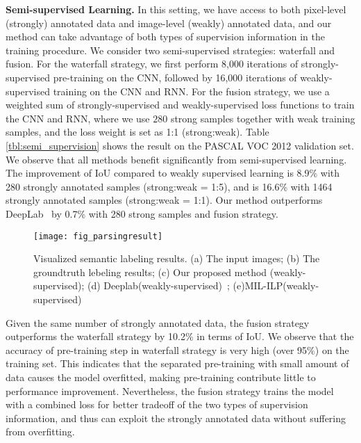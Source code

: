 \documentclass[10pt,twocolumn,letterpaper]{article}
\begin{document}
\textbf{Semi-supervised Learning.}
In this setting, we have access to both pixel-level (strongly) annotated data and image-level (weakly) annotated data, and our method can take advantage of both types of supervision information in the training procedure. We consider two semi-supervised strategies: waterfall and fusion. For the waterfall strategy, we first perform 8,000 iterations of strongly-supervised pre-training on the CNN, followed by 16,000 iterations of weakly-supervised training on the CNN and RNN. For the fusion strategy, we use a weighted sum of strongly-supervised and weakly-supervised loss functions to train the CNN and RNN, where we use $280$ strong samples together with weak training samples, and the loss weight is set as 1:1 (strong:weak). Table \ref{tbl:semi_supervision} shows the result on the PASCAL VOC 2012 validation set. We observe that all methods benefit significantly from semi-supervised learning. The improvement of IoU compared to weakly supervised learning is 8.9\% with 280 strongly annotated samples (strong:weak = 1:5), and is 16.6\% with 1464 strongly annotated samples (strong:weak = 1:1). Our method outperforms DeepLab~\cite{DBLP:WeaklySegmentation} by 0.7\% with 280 strong samples and fusion strategy.

\begin{figure}[tbp]
\centering
\texttt{[image: fig\_parsingresult]}
\caption{Visualized semantic labeling results. (a) The input images; (b) The groundtruth lebeling results; (c) Our proposed method (weakly-supervised); (d) Deeplab(weakly-supervised)~\cite{DBLP:WeaklySegmentation}; (e)MIL-ILP(weakly-supervised)~\cite{pinheiro2015image}}
\label{fig:labeling_result}
\end{figure}

Given the same number of strongly annotated data, the fusion strategy outperforms the waterfall strategy by 10.2\% in terms of IoU. We observe that the accuracy of pre-training step in waterfall strategy is very high (over 95\%) on the training set. This indicates that the separated pre-training with small amount of data causes the model overfitted, making pre-training contribute little to performance improvement. Nevertheless, the fusion strategy trains the model with a combined loss for better tradeoff of the two types of supervision information, and thus can exploit the strongly annotated data without suffering from overfitting.
\end{document}
